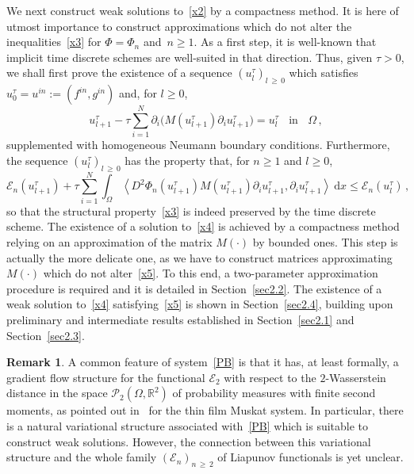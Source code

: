 \documentclass[10pt]{amsart}
\theoremstyle{definition}\newtheorem{defi}[theo]{Definition}\newtheorem{rema}[theo]{Remark}\newtheorem{exam}[theo]{Example}\newtheorem{exem}[theo]{Example}\newtheorem{nota}[theo]{Notation}
\newcommand{\bbR}{\mathbb{R}}
\newcommand{\clE}{\mathcal{E}}
\newcommand{\rmd}{\mathrm{d}}
\newcommand{\clP}{\mathcal{P}}
\begin{document}
We next construct weak solutions to~\eqref{x2} by a compactness method. It is here of utmost importance to construct approximations which do not alter the inequalities~\eqref{x3} for $\Phi=\Phi_n$ and~${n\ge 1}$. As a first step, it is well-known that implicit time discrete schemes are well-suited in that direction. Thus, given $\tau>0$, we shall first prove the existence of a sequence $(u^\tau_l)_{l\,\ge\,0}$ which satisfies~${u^\tau_0=u^{in}:=(f^{in},g^{in})}$ and, for $l\ge 0$,
\begin{equation}\label{x4}
u^\tau_{l+1} - \tau \sum_{i=1}^N\partial_i \Big(M(u^\tau_{l+1})\partial_i u^\tau_{l+1}\Big) = u^\tau_l \;\;\text{ in }\;\; \Omega\,, 
\end{equation}
supplemented with homogeneous Neumann boundary conditions. Furthermore, the sequence $(u^\tau_l)_{l\,\ge\,0}$ has the property that, for $n\ge 1$ and $l\ge 0$,
\begin{equation}\label{x5}
\clE_n\left(u_{l+1}^\tau\right) + \tau \sum_{i=1}^N\int_\Omega \left\langle D^2\Phi_n\left(u_{l+1}^\tau\right) M\left(u_{l+1}^\tau\right) \partial_i u_{l+1}^\tau, \partial_i u_{l+1}^\tau \right\rangle\ \rmd x \le \clE_n(u_{l}^\tau)\,, 
\end{equation}
so that the structural property~\eqref{x3} is indeed preserved by the time discrete scheme. The existence of a solution to~\eqref{x4} is achieved by a compactness method relying on an approximation of the matrix $M(\cdot)$ by bounded ones. This step is actually the more delicate one, as we have to construct matrices approximating $M(\cdot)$ which do not alter~\eqref{x5}. To this end, a two-parameter approximation procedure is required and it is detailed in Section~\ref{sec2.2}. The existence of a weak solution to~\eqref{x4} satisfying~\eqref{x5} is shown in Section~\ref{sec2.4}, building upon preliminary and intermediate results established in Section~\ref{sec2.1} and Section~\ref{sec2.3}.


\begin{rema}\label{rem.W}
A common feature of system~\eqref{PB} is that it has, at least formally, a gradient flow structure for the functional $\clE_2$ with respect to the $2$-Wasserstein distance in the space $\clP_2(\Omega,\bbR^2)$ of probability measures with finite second moments, as pointed out in~\cite{LM2013,ACCL2019} for the thin film Muskat system. In particular, there is a natural variational structure associated with~\eqref{PB} which is suitable to construct weak solutions. However, the connection between this variational structure and the whole family $(\clE_n)_{n\,\ge\,2}$ of Liapunov functionals is yet unclear.
\end{rema}
\end{document}
